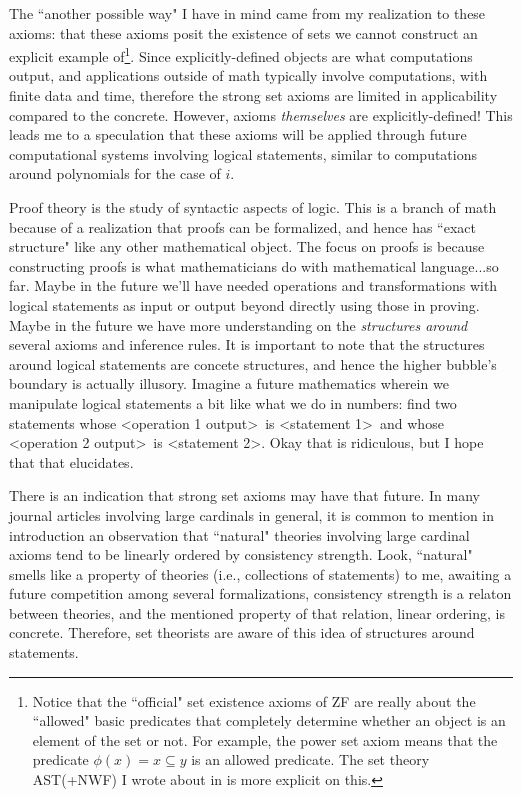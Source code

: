 \documentclass{article}
\theoremstyle{plain}
\begin{document}
The ``another possible way" I have in mind came from my realization to these axioms: that these axioms posit the existence of sets we cannot construct an explicit example of\footnote{Notice that the ``official" set existence axioms of \textsf{ZF} are really about the ``allowed" basic predicates that completely determine whether an object is an element of the set or not. For example, the power set axiom means that the predicate $\phi(x) = x \subseteq y$ is an allowed predicate. The set theory \textsf{AST(+NWF)} I wrote about in \cite{astnwf} is more explicit on this.}. Since explicitly-defined objects are what computations output, and applications outside of math typically involve computations, with finite data and time, therefore the strong set axioms are limited in applicability compared to the concrete. However, axioms \textit{themselves} are explicitly-defined! This leads me to a speculation that these axioms will be applied through future computational systems involving logical statements, similar to computations around polynomials for the case of $i$.

Proof theory is the study of syntactic aspects of logic. This is a branch of math because of a realization that proofs can be formalized, and hence has ``exact structure" like any other mathematical object. The focus on proofs is because constructing proofs is what mathematicians do with mathematical language...so far. Maybe in the future we'll have needed operations and transformations with logical statements as input or output beyond directly using those in proving. Maybe in the future we have more understanding on the \textit{structures around} several axioms and inference rules. It is important to note that the structures around logical statements are concete structures, and hence the higher bubble's boundary is actually illusory. Imagine a future mathematics wherein we manipulate logical statements a bit like what we do in numbers: find two statements whose \textless operation 1 output\textgreater\ is \textless statement 1\textgreater\ and whose \textless operation 2 output\textgreater\ is \textless statement 2\textgreater. Okay that is ridiculous, but I hope that that elucidates.

There is an indication that strong set axioms may have that future. In many journal articles involving large cardinals in general, it is common to mention in introduction an observation that ``natural" theories involving large cardinal axioms tend to be linearly ordered by consistency strength\cite{hamkins2025}. Look, ``natural" smells like a property of theories (i.e., collections of statements) to me, awaiting a future competition among several formalizations, consistency strength is a relaton between theories, and the mentioned property of that relation, linear ordering, is concrete. Therefore, set theorists are aware of this idea of structures around statements.
\end{document}
